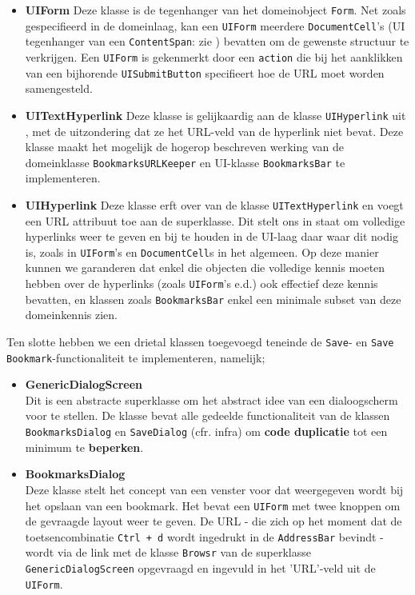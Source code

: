 \documentclass[12pt]{article}
\begin{document}
\begin{itemize}
\begin{itemize}
		\item \textbf{UIForm}
		Deze klasse is de tegenhanger van het domeinobject \texttt{Form}. Net zoals gespecifieerd in de domeinlaag, kan een \texttt{UIForm} meerdere \texttt{DocumentCell}'s (UI tegenhanger van een \texttt{ContentSpan}: zie ) bevatten om de gewenste structuur te verkrijgen. Een \texttt{UIForm} is gekenmerkt door een \texttt{action} die bij het aanklikken van een bijhorende \texttt{UISubmitButton} specifieert hoe de URL moet worden samengesteld.
		
		\item \textbf{UITextHyperlink} 
		Deze klasse is gelijkaardig aan de klasse \texttt{UIHyperlink} uit , met de uitzondering dat ze het URL-veld van de hyperlink niet bevat. Deze klasse maakt het mogelijk de hogerop beschreven werking van de domeinklasse \texttt{BookmarksURLKeeper} en UI-klasse \texttt{BookmarksBar} te implementeren. 
		
		\item \textbf{UIHyperlink}
		Deze klasse erft over van de klasse \texttt{UITextHyperlink} en voegt een URL attribuut toe aan de superklasse. Dit stelt ons in staat om volledige hyperlinks weer te geven en bij te houden in de UI-laag daar waar dit nodig is, zoals in \texttt{UIForm}'s en \texttt{DocumentCell}s in het algemeen. Op deze manier kunnen we garanderen dat enkel die objecten die volledige kennis moeten hebben over de hyperlinks (zoals \texttt{UIForm}'s e.d.) ook effectief deze kennis bevatten, en klassen zoals \texttt{BookmarksBar} enkel een minimale subset van deze domeinkennis zien.
	\end{itemize}

	Ten slotte hebben we een drietal klassen toegevoegd teneinde de \texttt{Save}- en \texttt{Save Bookmark}-functionaliteit te implementeren, namelijk;
	\begin{itemize}
		\item \textbf{GenericDialogScreen}\\
		Dit is een abstracte superklasse om het abstract idee van een dialoogscherm voor te stellen. De klasse bevat alle gedeelde functionaliteit van de klassen \texttt{BookmarksDialog} en \texttt{SaveDialog} (cfr. infra) om \textbf{code duplicatie} tot een minimum te \textbf{beperken}.
		
		\item \textbf{BookmarksDialog}\\
		Deze klasse stelt het concept van een venster voor dat weergegeven wordt bij het opslaan van een bookmark. Het bevat een \texttt{UIForm} met twee knoppen om de gevraagde layout weer te geven. De URL - die zich op het moment dat de toetsencombinatie \texttt{Ctrl + d} wordt ingedrukt in de \texttt{AddressBar} bevindt - wordt via de link met de klasse \texttt{Browsr} van de superklasse \texttt{GenericDialogScreen} opgevraagd en ingevuld in het 'URL'-veld uit de \texttt{UIForm}. 
		

\end{itemize}
\end{itemize}
\end{document}
